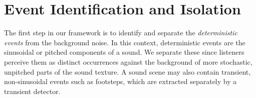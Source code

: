 \documentclass{acmsiggraph}               %
\begin{document}
\section{Event Identification and Isolation}

The first step in our framework is to identify and separate the \textit{deterministic events}
from the background noise. In this context, deterministic events are the sinusoidal or pitched 
components of a sound. We separate these since listeners perceive them as distinct 
occurrences against the background of more stochastic, unpitched parts of 
the sound texture. A sound scene may also contain transient, non-sinusoidal events such as footsteps, which are extracted separately by a transient detector. 


%
%
%
%
\end{document}
